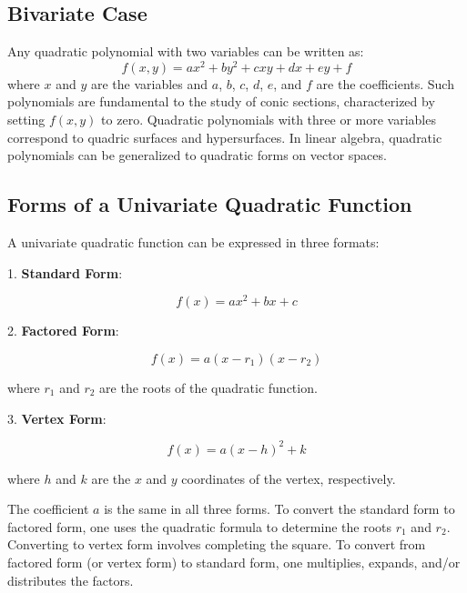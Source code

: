 \subsection{Bivariate Case}
\label{sss:biva-dd5b}

Any quadratic polynomial with two variables can be written as:
\[
f(x, y) = ax^2 + by^2 + cxy + dx + ey + f
\]
where $x$ and $y$ are the variables and $a$, $b$, $c$, $d$, $e$, and $f$ are the coefficients. Such polynomials are fundamental to the study of conic sections, characterized by setting $f(x, y)$ to zero. Quadratic polynomials with three or more variables correspond to quadric surfaces and hypersurfaces. In linear algebra, quadratic polynomials can be generalized to quadratic forms on vector spaces.

\subsection{Forms of a Univariate Quadratic Function}
\label{sss:form-3213}

A univariate quadratic function can be expressed in three formats:

1. \textbf{Standard Form}:

   \[
f(x) = ax^2 + bx + c
\]

2. \textbf{Factored Form}:

   \[
f(x) = a(x - r_1)(x - r_2)
\]

   where $r_1$ and $r_2$ are the roots of the quadratic function.

3. \textbf{Vertex Form}:

   \[
f(x) = a(x - h)^2 + k
\]

   where $h$ and $k$ are the $x$ and $y$ coordinates of the vertex, respectively.

The coefficient $a$ is the same in all three forms. To convert the standard form to factored form, one uses the quadratic formula to determine the roots $r_1$ and $r_2$. Converting to vertex form involves completing the square. To convert from factored form (or vertex form) to standard form, one multiplies, expands, and/or distributes the factors.

